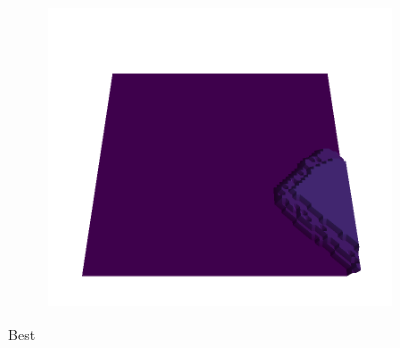 \documentclass[../document.tex]{subfiles}
\begin{document}
\begin{figure}[H]
    \begin{subfigure}[b]{0.19\textwidth}
        \includegraphics[width=\linewidth]{../img/5/quarry/best//patch-3d-majavi-colormap-4.png}
    \end{subfigure}  

\caption{Best}    
\end{figure}
\end{document}
